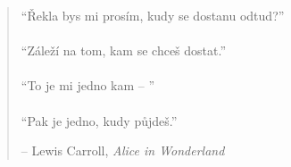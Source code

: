 
\newpage \vspace*{4cm}
\thispagestyle{empty}
\begin{quotation}
\begin{center}
  \large
  \enquote{Řekla bys mi prosím, kudy se dostanu odtud?} \\~\\
  \enquote{Záleží na tom, kam se chceš dostat.} \\~\\
  \enquote{To je mi jedno kam – } \\~\\
  \enquote{Pak je jedno, kudy půjdeš.}
\end{center}
\begin{flushright} -- Lewis Carroll, \textit{Alice in Wonderland}\end{flushright}
\end{quotation}

